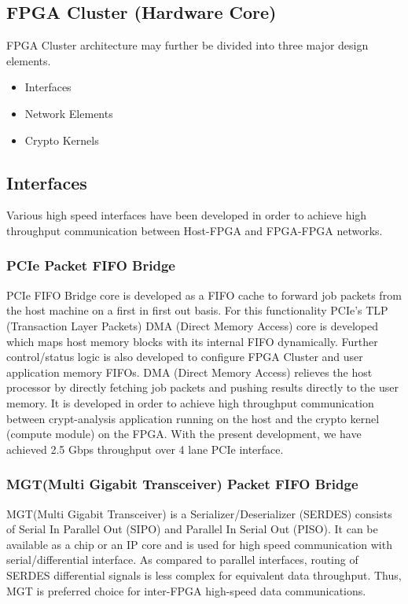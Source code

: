 \documentclass[10pt, conference, compsocconf]{IEEEtran}
\begin{document}
\subsection{FPGA Cluster (Hardware Core)}
FPGA Cluster architecture may further be divided into three major design elements.

\begin{itemize}
  \item Interfaces
  \item Network Elements
  \item Crypto Kernels
\end{itemize}

\subsection{Interfaces}
Various high speed interfaces have been developed in order to achieve high throughput communication between Host-FPGA and FPGA-FPGA networks.

\subsubsection{PCIe Packet FIFO Bridge}
PCIe FIFO Bridge core is developed as a FIFO cache to forward job packets from the host machine on a first in first out basis. For this functionality PCIe's TLP (Transaction Layer Packets) DMA (Direct Memory Access) core is developed which maps host memory blocks with its internal FIFO dynamically. Further control/status logic is also developed to configure FPGA Cluster and user application memory FIFOs. DMA (Direct Memory Access) relieves the host processor by directly fetching job packets and pushing results directly to the user memory. It is developed in order to achieve high throughput communication between crypt-analysis application running on the host and the crypto kernel (compute module) on the FPGA. With the present development, we have achieved 2.5 Gbps throughput over 4 lane PCIe interface.


\subsubsection{MGT(Multi Gigabit Transceiver) Packet FIFO Bridge}
MGT(Multi Gigabit Transceiver) is a Serializer/Deserializer (SERDES) consists of Serial In Parallel Out (SIPO) and Parallel In Serial Out (PISO). It can be available as a chip or an IP core and is used for high speed communication with serial/differential interface. As compared to parallel interfaces, routing of SERDES differential signals is less complex for equivalent data throughput. Thus, MGT is preferred choice for inter-FPGA high-speed data communications.
\end{document}
